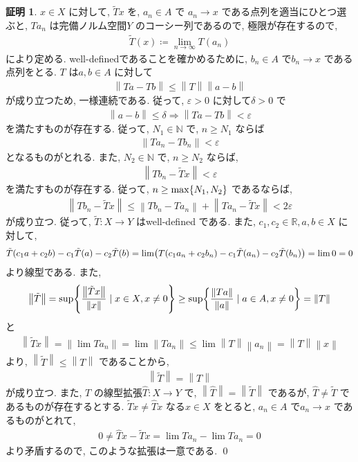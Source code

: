 \documentclass[10pt, fleqn, label-section=none]{bxjsarticle}
\theoremstyle{definition}
\newtheorem*{pf*}{証明}
\newcommand{\veps}{\varepsilon}
\newcommand{\paren}[1]{\mleft( #1\mright )}
\newcommand{\cbra}[1]{\mleft\{#1\mright\}}
\newcommand{\norm}[1]{\left\|#1\right\|}
\newcommand{\naraba}{\Rightarrow}
\renewcommand{\;}{\, ; \,}
\begin{document}
\begin{pf*}$x \in X$ に対して, $\tilde T x$ を, $a_n \in A$ で $a_n \rightarrow x$ である点列を適当にひとつ選ぶと,  $Ta_n$ は完備ノルム空間$Y$ のコーシー列であるので, 極限が存在するので, 
\begin{align*} \tilde T (x) \coloneqq \lim_{n \rightarrow \infty} T(a_n)  \end{align*}
により定める. well-definedであることを確かめるために, $b_n \in A$ で$b_n \rightarrow x$ である点列をとる. $T$ は$a, b \in A$ に対して
\begin{align*} \norm{Ta- Tb} \leq \norm{T} \norm{a - b}\end{align*}
が成り立つため, 一様連続である. 従って, $\veps > 0$ に対して$\delta > 0$ で
\begin{align*} \norm{a - b} \leq \delta \naraba \norm{Ta - Tb} < \veps \end{align*}
を満たすものが存在する. 従って, $N_1 \in \mathbb N$ で, $n \geq N_1$ ならば
\begin{align*} \norm{Ta_n - Tb_n } < \veps \end{align*}
となるものがとれる. また, $N_2 \in \mathbb N$ で, $n \geq N_2$ ならば, 
\begin{align*} \norm{Tb_n - \tilde T x} < \veps \end{align*} を満たすものが存在する. 従って, $n \geq \max \cbra{N_1, N_2}$ であるならば, 
\begin{align*} \norm{T b_n - \tilde T x} \leq \norm{Tb_n - T a_n} + \norm{T a_n - \tilde T x} < 2 \veps  \end{align*}
が成り立つ. 従って, $\tilde T : X \rightarrow Y$ はwell-defined である. また, $c_1, c_2 \in \mathbb R, a, b \in X$ に対して,
\begin{align*} \tilde T(c_1 a + c_2 b) - c_1 \tilde T (a) - c_2 \tilde T(b) = \lim \paren{T(c_1 a_n + c_2 b_n) - c_1 \tilde T (a_n) - c_2 \tilde T(b_n)  } = \lim 0 = 0 \end{align*}
より線型である. また, 
\begin{align*} \norm{\tilde T} = \sup \cbra{ \frac{\norm{\tilde T x}}{\norm x} \mid x \in X, x \neq 0 }  \geq \sup \cbra{ \frac{\norm{T a}}{\norm a} \mid a \in A, x \neq 0 } = \norm{T} \end{align*} と
\begin{align*} \norm{\tilde T x} = \norm{\lim T a_n} = \lim \norm{T a_n} \leq \lim \norm{T} \norm{a_n} = \norm{T} \norm{x}  \end{align*}
より, $\norm{\tilde T} \leq \norm{T}$ であることから, 
\begin{align*} \norm{ \tilde T} = \norm{T} \end{align*}
が成り立つ. また, $T$ の線型拡張$\hat T: X \rightarrow Y$ で, $\norm {\hat T} = \norm{ \tilde T}$ であるが, $\hat T \neq \tilde T$ であるものが存在するとする. $\tilde T x \neq \hat T x$ なる$x \in X$ をとると, $a_n \in A$ で$a_n \rightarrow x$ であるものがとれて, 
\begin{align*} 0 \neq \hat T x - \tilde T x = \lim T a_n - \lim T a_n = 0 \end{align*} 
より矛盾するので, このような拡張は一意である. 
\qed
\end{pf*}
\end{document}
